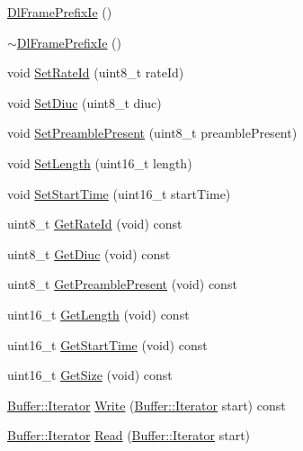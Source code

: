 \begin{DoxyCompactItemize}
\item 
\hyperlink{classns3_1_1DlFramePrefixIe_ad1baaeae9465b1d4324b819582f00b36}{Dl\+Frame\+Prefix\+Ie} ()
\item 
\hyperlink{classns3_1_1DlFramePrefixIe_ab68d459e39637100f2e7573bebd78e99}{$\sim$\+Dl\+Frame\+Prefix\+Ie} ()
\item 
void \hyperlink{classns3_1_1DlFramePrefixIe_ad84627184b9f98872779846b3bacb3b8}{Set\+Rate\+Id} (uint8\+\_\+t rate\+Id)
\item 
void \hyperlink{classns3_1_1DlFramePrefixIe_a6645cd17a46324e04eb8eecf46835cfd}{Set\+Diuc} (uint8\+\_\+t diuc)
\item 
void \hyperlink{classns3_1_1DlFramePrefixIe_a84f5deb1b2cf1c562fca462697750f0e}{Set\+Preamble\+Present} (uint8\+\_\+t preamble\+Present)
\item 
void \hyperlink{classns3_1_1DlFramePrefixIe_a67eaa10eccd68b242355873541abd9f6}{Set\+Length} (uint16\+\_\+t length)
\item 
void \hyperlink{classns3_1_1DlFramePrefixIe_a58b3b06b634931b67a840e18addc53d8}{Set\+Start\+Time} (uint16\+\_\+t start\+Time)
\item 
uint8\+\_\+t \hyperlink{classns3_1_1DlFramePrefixIe_abaec3d5c0f0b2dfee8f47c68b3f61da2}{Get\+Rate\+Id} (void) const 
\item 
uint8\+\_\+t \hyperlink{classns3_1_1DlFramePrefixIe_a24908505260fe36138ffe2d311560e6f}{Get\+Diuc} (void) const 
\item 
uint8\+\_\+t \hyperlink{classns3_1_1DlFramePrefixIe_a61a65c3e12f2beb4f792dfdc78619320}{Get\+Preamble\+Present} (void) const 
\item 
uint16\+\_\+t \hyperlink{classns3_1_1DlFramePrefixIe_ab513562ad9080ba3f867d0969e8b88a8}{Get\+Length} (void) const 
\item 
uint16\+\_\+t \hyperlink{classns3_1_1DlFramePrefixIe_ad605b7d44d96c2050e6cc3a7016e03e4}{Get\+Start\+Time} (void) const 
\item 
uint16\+\_\+t \hyperlink{classns3_1_1DlFramePrefixIe_a220456b9ef5a00feeeedb27a26fa5886}{Get\+Size} (void) const 
\item 
\hyperlink{classns3_1_1Buffer_1_1Iterator}{Buffer\+::\+Iterator} \hyperlink{classns3_1_1DlFramePrefixIe_afd972b50d7b09b0fee45f27b54a3eb8e}{Write} (\hyperlink{classns3_1_1Buffer_1_1Iterator}{Buffer\+::\+Iterator} start) const 
\item 
\hyperlink{classns3_1_1Buffer_1_1Iterator}{Buffer\+::\+Iterator} \hyperlink{classns3_1_1DlFramePrefixIe_a7ab13482a48df298da49dfbccd7fd1d7}{Read} (\hyperlink{classns3_1_1Buffer_1_1Iterator}{Buffer\+::\+Iterator} start)
\end{DoxyCompactItemize}
